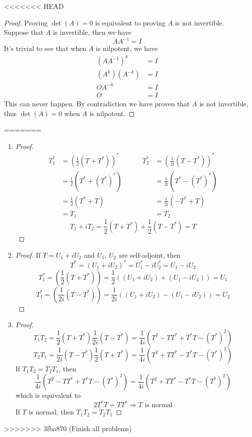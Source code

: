 \begin{homeworkProblem}

\solution
<<<<<<< HEAD

\begin{proof}
Proving $\det(A) = 0$ is equivalent to proving $A$ is not invertible. Suppose that $A$ is invertible, then we have \[
    AA^{-1} = I
\]
It's trivial to see that when $A$ is nilpotent, we have \[
\begin{aligned}
    (AA^{-1})^{k} &= I \\
    (A^{k})(A^{-k}) &= I \\
    O A^{-k} &= I \\
    O &= I
\end{aligned}
\]
This can never happen. By contradiction we have proven that $A$ is not invertible, thus $\det(A) = 0$ when $A$ is nilpotent.
\end{proof}
=======
\begin{enumerate}
    \item \begin{proof}
\[
\begin{aligned}
T_1^* &= \left(\frac{1}{2}(T + T^*)\right)^* \\
&= \frac{1}{2}(T^* + (T^*)^*)\\
&= \frac{1}{2}(T^* + T) \\
&= T_1
\end{aligned}
\quad \, \quad
\begin{aligned}
T_2^* &= \left(\frac{1}{2i}(T - T^*)\right)^* \\
&= \frac{1}{2i}(T^* - (T^*)^*) \\
&= \frac{1}{2i}(-T^* + T) \\
&= T_2
\end{aligned}
\]
\[T_1 + iT_2 = \frac{1}{2} (T + T^*) + \frac{1}{2}(T - T^*) = T \]
\end{proof}
\item \begin{proof}
    If $T = U_1 + i U_2$ and $U_1$, $U_2$ are self-adjoint, then
    \[
        T^* = (U_1 + iU_2)^* = U_1^* - iU_2^* = U_1 - iU_2
    \]
    \[
        T_1^* = \left(\frac{1}{2}(T + T^*)\right)= \frac{1}{2}((U_1 + iU_2) + (U_1 - iU_2)) = U_1
    \]
    \[
        T_1^* = \left(\frac{1}{2i}(T - T^*)\right)= \frac{1}{2i}((U_1 + iU_2) - (U_1 - iU_2)) = U_2
    \]
\end{proof}
\item \begin{proof}
\[
T_1T_2 = \frac{1}{2}(T + T^*)\frac{1}{2i}(T - T^*) = \frac{1}{4i}(T^2 - TT^* + T^*T - (T^*)^2)
\]
\[
T_2T_1 = \frac{1}{2i}(T - T^*)\frac{1}{2}(T + T^*) = \frac{1}{4i}(T^2 + TT^* - T^*T - (T^*)^2)
\]
If $T_1T_2 = T_2 T_1$, then \[
    \frac{1}{4i}(T^2 - TT^* + T^*T - (T^*)^2) = \frac{1}{4i}(T^2 + TT^* - T^*T - (T^*)^2)
\] which is equivalent to \[
2T^*T = TT^* \Longrightarrow T \text{ is normal}
\]
If $T$ is normal, then $T_1T_2 = T_2T_1$
\end{proof}
\end{enumerate}

>>>>>>> 3fba870 (Finish all problems)
\end{homeworkProblem}
